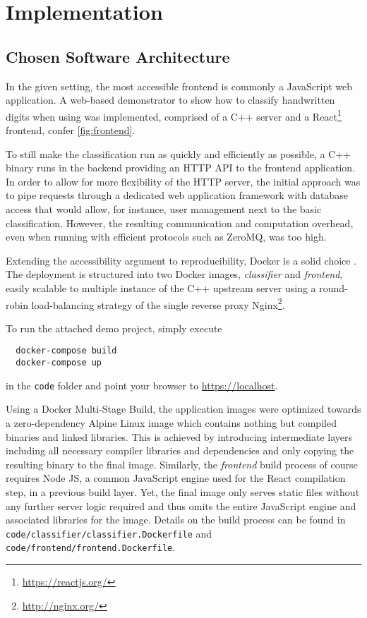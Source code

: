 \chapter{Implementation}
\label{chap:implementation}

\section{Chosen Software Architecture}
In the given setting, the most accessible frontend is commonly a JavaScript web application.
A web-based demonstrator to show how to classify handwritten digits when using  was implemented, comprised of a C++ server and a React\footnote{\url{https://reactjs.org/}} frontend, confer \cref{fig:frontend}.

To still make the classification run as quickly and efficiently as possible, a C++ binary runs in the backend providing an HTTP API to the frontend application.
In order to allow for more flexibility of the HTTP server, the initial approach was to pipe requests through a dedicated web application framework with database access that would allow, for instance, user management next to the basic classification.
However, the resulting communication and computation overhead, even when running with efficient protocols such as ZeroMQ, was too high.

Extending the accessibility argument to reproducibility, Docker is a solid choice \parencite{using-docker-in-science}.
The deployment is structured into two Docker images, \textit{classifier} and \textit{frontend}, easily scalable to multiple instance of the C++ upstream server using a round-robin load-balancing strategy of the single reverse proxy Nginx\footnote{\url{http://nginx.org/}}.

To run the attached demo project, simply execute
\begin{verbatim}
  docker-compose build
  docker-compose up
\end{verbatim}
in the \texttt{code} folder and point your browser to \url{https://localhost}.

Using a Docker Multi-Stage Build, the application images were optimized towards a zero-dependency Alpine Linux image which contains nothing but compiled binaries and linked libraries.
This is achieved by introducing intermediate layers including all necessary compiler libraries and dependencies and only copying the resulting binary to the final image.
Similarly, the \textit{frontend} build process of course requires Node JS, a common JavaScript engine used for the React compilation step, in a previous build layer.
Yet, the final image only serves static files without any further server logic required and thus omits the entire JavaScript engine and associated libraries for the image.
Details on the build process can be found in \texttt{code/classifier/classifier.Dockerfile} and \texttt{code/frontend/frontend.Dockerfile}.

